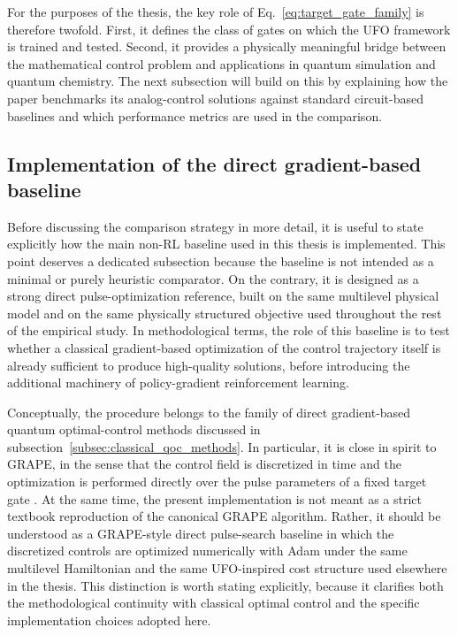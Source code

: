 For the purposes of the thesis, the key role of Eq.~\eqref{eq:target_gate_family} is therefore twofold. First, it defines the class of gates on which the UFO framework is trained and tested. Second, it provides a physically meaningful bridge between the mathematical control problem and applications in quantum simulation and quantum chemistry. The next subsection will build on this by explaining how the paper benchmarks its analog-control solutions against standard circuit-based baselines and which performance metrics are used in the comparison.


\subsection{Implementation of the direct gradient-based baseline}
\label{subsec:implementation_adam_baseline}

Before discussing the comparison strategy in more detail, it is useful to state explicitly how the main non-RL baseline used in this thesis is implemented. This point deserves a dedicated subsection because the baseline is not intended as a minimal or purely heuristic comparator. On the contrary, it is designed as a strong direct pulse-optimization reference, built on the same multilevel physical model and on the same physically structured objective used throughout the rest of the empirical study. In methodological terms, the role of this baseline is to test whether a classical gradient-based optimization of the control trajectory itself is already sufficient to produce high-quality solutions, before introducing the additional machinery of policy-gradient reinforcement learning.

Conceptually, the procedure belongs to the family of direct gradient-based quantum optimal-control methods discussed in subsection~\ref{subsec:classical_qoc_methods}. In particular, it is close in spirit to GRAPE, in the sense that the control field is discretized in time and the optimization is performed directly over the pulse parameters of a fixed target gate \cite{Khaneja2005,Koch2022}. At the same time, the present implementation is not meant as a strict textbook reproduction of the canonical GRAPE algorithm. Rather, it should be understood as a GRAPE-style direct pulse-search baseline in which the discretized controls are optimized numerically with Adam under the same multilevel Hamiltonian and the same UFO-inspired cost structure used elsewhere in the thesis. This distinction is worth stating explicitly, because it clarifies both the methodological continuity with classical optimal control and the specific implementation choices adopted here.

